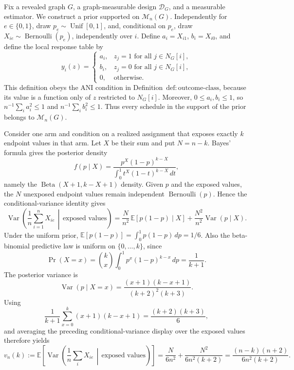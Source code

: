 Fix a revealed graph \(G\), a graph-measurable design \(\mathcal D_G\), and a measurable estimator.  We construct a prior supported on \(\mathcal M_n(G)\).  Independently for \(e\in\{0,1\}\), draw \(p_e\sim\operatorname{Unif}[0,1]\), and, conditional on \(p_e\), draw \(X_{ie}\sim\operatorname{Bernoulli}(p_e)\), independently over \(i\).  Define \(a_i=X_{i1}\), \(b_i=X_{i0}\), and define the local response table by
\[
y_i(z)=
\begin{cases}
a_i,&z_j=1\text{ for all }j\in N_G[i],\\
b_i,&z_j=0\text{ for all }j\in N_G[i],\\
0,&\text{otherwise}.
\end{cases}
\]
This definition obeys the ANI condition in Definition~\(\mathrm{def{:}outcome\mbox{-}class}\), because its value is a function only of \(z\) restricted to \(N_G[i]\).  Moreover, \(0\le a_i,b_i\le1\), so \(n^{-1}\sum_i a_i^2\le1\) and \(n^{-1}\sum_i b_i^2\le1\).  Thus every schedule in the support of the prior belongs to \(\mathcal M_n(G)\).

Consider one arm and condition on a realized assignment that exposes exactly \(k\) endpoint values in that arm.  Let \(X\) be their sum and put \(N=n-k\).  Bayes' formula gives the posterior density
\[
f(p\mid X)=\frac{p^X(1-p)^{k-X}}{\int_0^1t^X(1-t)^{k-X}\,dt},
\]
namely the \(\operatorname{Beta}(X+1,k-X+1)\) density.  Given \(p\) and the exposed values, the \(N\) unexposed endpoint values remain independent \(\operatorname{Bernoulli}(p)\).  Hence the conditional-variance identity gives
\[
\operatorname{Var}\!\left(\frac1n\sum_{i=1}^nX_{ie}\,\middle|\,\text{exposed values}\right)
=\frac{N}{n^2}\,\mathbb E[p(1-p)\mid X]
+\frac{N^2}{n^2}\operatorname{Var}(p\mid X).
\]
Under the uniform prior, \(\mathbb E[p(1-p)]=\int_0^1p(1-p)\,dp=1/6\).  Also the beta-binomial predictive law is uniform on \(\{0,\ldots,k\}\), since
\[
\Pr(X=x)=\binom{k}{x}\int_0^1p^x(1-p)^{k-x}\,dp=\frac1{k+1}.
\]
The posterior variance is
\[
\operatorname{Var}(p\mid X=x)
=\frac{(x+1)(k-x+1)}{(k+2)^2(k+3)}.
\]
Using
\[
\frac1{k+1}\sum_{x=0}^k(x+1)(k-x+1)=\frac{(k+2)(k+3)}6,
\]
and averaging the preceding conditional-variance display over the exposed values therefore yields
\[
v_n(k):=\mathbb E\!\left[\operatorname{Var}\!\left(\frac1n\sum_iX_{ie}\,\middle|\,\text{exposed values}\right)\right]
=\frac{N}{6n^2}+\frac{N^2}{6n^2(k+2)}
=\frac{(n-k)(n+2)}{6n^2(k+2)}.
\]

